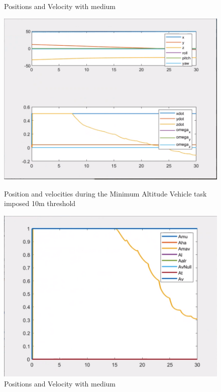 \documentclass{article}
\begin{document}
\begin{figure}[htpb]
\begin{minipage}{0.43\textwidth}
\caption{Positions and Velocity with medium}\label{10m_A} 
\end{minipage} 
\end{figure}

\begin{figure}[htpb] 
\begin{minipage}{0.40\textwidth}  
\includegraphics[width=\textwidth]{123_5m_ppdot.png}
\caption{Position and velocities during the Minimum Altitude Vehicle task imposed 10m threshold}\label{5m_ppdot} 
\end{minipage}  
\hspace{0.2\textwidth} 
\begin{minipage}{0.43\textwidth}  
\includegraphics[width=\textwidth]{123_5m_A.png}
\caption{Positions and Velocity with medium}\label{5m_A} 
\end{minipage} 
\end{figure}
\end{document}
